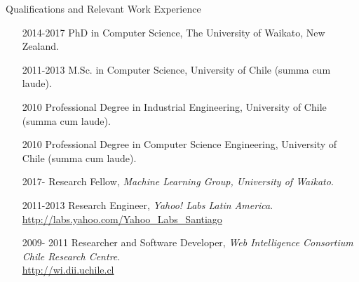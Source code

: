 \documentclass[handout]{beamer}
\begin{document}
\begin{frame}{Qualifications and Relevant Work Experience}
\begin{scriptsize}
  \begin{enumerate}
\item[2014-2017] PhD in Computer Science, The University of Waikato, New Zealand.

\item[2011-2013] M.Sc. in Computer Science, University of Chile (summa cum laude).

\item[2010] Professional Degree in Industrial Engineering, University of Chile (summa cum laude).

\item[2010] Professional Degree in Computer Science Engineering, University of Chile (summa cum laude).


\item[ 2017-] Research Fellow, \textit{Machine Learning Group, University of Waikato}. \\
\item[2011-2013] Research Engineer, \textit{Yahoo! Labs Latin America}. \\ \url{http://labs.yahoo.com/Yahoo_Labs_Santiago} 
\item[2009- 2011] Researcher and Software Developer, \textit{Web Intelligence Consortium Chile Research Centre}.    \\ \url{http://wi.dii.uchile.cl}


  \end{enumerate} 
\end{scriptsize}

\end{frame}
\end{document}
